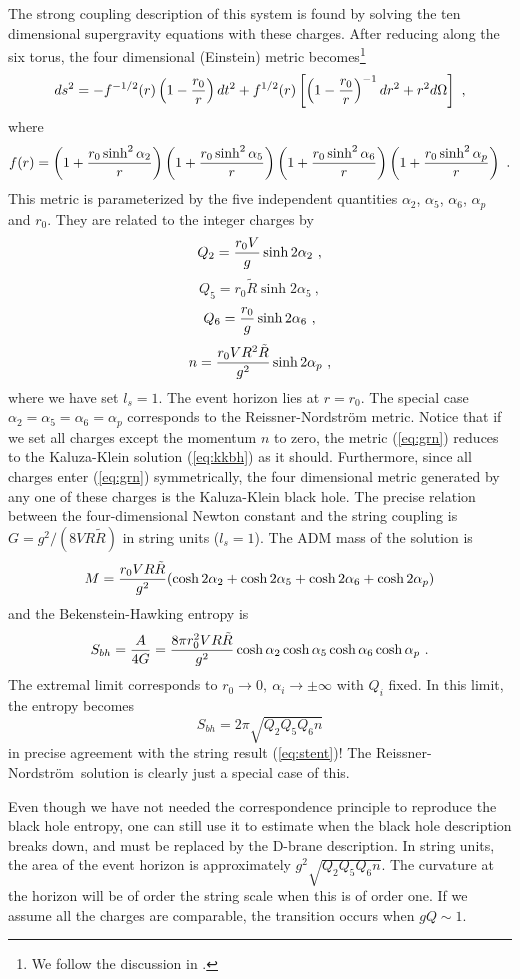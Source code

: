 \documentclass[12pt]{article}
\newcommand{\eq}{\begin{equation}}
\newcommand{\eqe}{\end{equation}}
\newcommand{\e}[1]{\label{eq:#1}}
\newcommand{\ee}[1]{(\ref{eq:#1})}
\newcommand{\RN}{Reissner-Nordstr\"om}
\begin{document}
The strong coupling description of this system is found by solving the ten
dimensional supergravity equations with these charges. After reducing
along the six torus, the four dimensional (Einstein) metric becomes\footnote{We
follow the discussion in \cite{hlm}.}
\cite{cvyo} 
$$ds^2 = - f^{-1/2}(r)\left(1 - {r_0  \over r}\right) dt^2 +
 {f^{1/2}(r) }\left[
 \left( 1 -{r_0 \over r} \right)^{-1}  dr^2
 +  r^2 d\Omega \right]~,$$
where
\eq\e{grn}
 f(r) =
 \left(1 +{ r_0 \sinh^2
 \alpha_2  \over r}\right)\left(1 + { r_0  \sinh^2 \alpha_5 \over r}\right)
 \left(1+ { r_0  \sinh^2 \alpha_6 \over r}\right)\left(1 + { r_0
 \sinh^2 \alpha_p \over r }\right)~.
 \eqe
This metric is parameterized by the
five  independent quantities $\alpha_2$, $\alpha_5$,
$\alpha_6$, $\alpha_p$ and $r_0$. They are related to the integer
charges by
$$Q_2  = {  r_0 V \over g }
\sinh 2\alpha_2 ~, $$
$$Q_5 = { r_0 \tilde R   }
\sinh 2\alpha_5 ~, $$
$$ Q_6 = {  r_0 \over  g}
\sinh 2\alpha_6 ~, $$
\eq\e{charges}
n = {  r_0 V R^2  \tilde R \over g^2 }
\sinh 2\alpha_p ~, 
\eqe
where we have set $l_s=1$.
The event horizon lies at $r=r_0$. The special case $\alpha_2 = \alpha_5
=\alpha_6=\alpha_p$ corresponds to the Reissner-Nordstr\"om metric.
Notice that if we set all charges except the momentum $n$ to zero,
the metric \ee{grn} reduces to the Kaluza-Klein solution \ee{kkbh} as
it should. Furthermore, since all charges enter \ee{grn} symmetrically,
the four dimensional metric generated by any one of these charges is the
Kaluza-Klein black hole. The precise relation between
the four-dimensional Newton constant and the string coupling is
$G =  g^2/(8 V R \tilde R)$ in string units ($l_s =1$).
The ADM mass of the solution is
\eq\e{admmass}
M= { r_0  V R \tilde R \over g^2}
 (\cosh 2\alpha_2+
 \cosh 2\alpha_5 + \cosh 2 \alpha_6 + \cosh 2 \alpha_p )
\eqe
and the Bekenstein-Hawking entropy is 
\eq\e{bhentropy}
S_{bh} ={A\over 4G} = {8 \pi r_0^2 V R \tilde R \over g^2} \cosh \alpha_2
\cosh \alpha_5 \cosh \alpha_6 \cosh \alpha_p ~.
\eqe
The extremal limit corresponds to $r_0 \rightarrow 0, \
\alpha_i \rightarrow \pm \infty$ with $Q_i$ fixed. In this limit,
the entropy becomes
\eq
S_{bh} = 2\pi \sqrt{Q_2 Q_5 Q_6 n}
\eqe
in precise agreement with the string result \ee{stent}! The \RN\ solution
is clearly just a special case of this.

Even though we have not needed the correspondence principle to 
reproduce the black hole entropy, one can still use it to
estimate when the black hole description breaks down, and must be
replaced by the D-brane description. In string units, the area of the
event horizon is approximately $g^2 \sqrt{Q_2 Q_5 Q_6 n}$. The curvature
at the horizon will be of order the string scale when this is of order one.
If we assume all the charges are comparable, the transition occurs when
$gQ\sim 1$.
\end{document}
